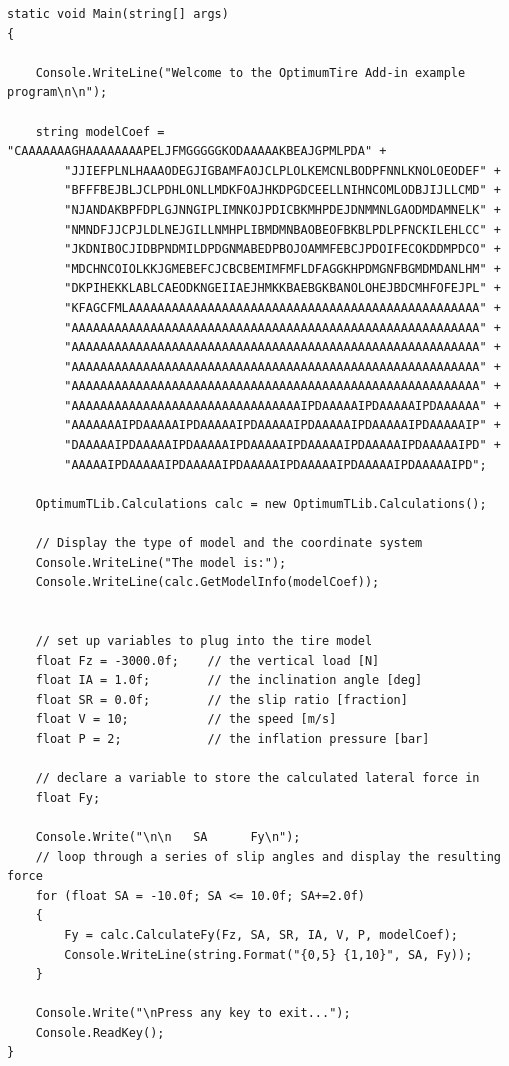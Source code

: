 \begin{verbatim}
static void Main(string[] args)
{

    Console.WriteLine("Welcome to the OptimumTire Add-in example program\n\n");
           
    string modelCoef = "CAAAAAAAGHAAAAAAAAPELJFMGGGGGKODAAAAAKBEAJGPMLPDA" +
        "JJIEFPLNLHAAAODEGJIGBAMFAOJCLPLOLKEMCNLBODPFNNLKNOLOEODEF" +
        "BFFFBEJBLJCLPDHLONLLMDKFOAJHKDPGDCEELLNIHNCOMLODBJIJLLCMD" +
        "NJANDAKBPFDPLGJNNGIPLIMNKOJPDICBKMHPDEJDNMMNLGAODMDAMNELK" +
        "NMNDFJJCPJLDLNEJGILLNMHPLIBMDMNBAOBEOFBKBLPDLPFNCKILEHLCC" +
        "JKDNIBOCJIDBPNDMILDPDGNMABEDPBOJOAMMFEBCJPDOIFECOKDDMPDCO" +
        "MDCHNCOIOLKKJGMEBEFCJCBCBEMIMFMFLDFAGGKHPDMGNFBGMDMDANLHM" +
        "DKPIHEKKLABLCAEODKNGEIIAEJHMKKBAEBGKBANOLOHEJBDCMHFOFEJPL" +
        "KFAGCFMLAAAAAAAAAAAAAAAAAAAAAAAAAAAAAAAAAAAAAAAAAAAAAAAAA" +
        "AAAAAAAAAAAAAAAAAAAAAAAAAAAAAAAAAAAAAAAAAAAAAAAAAAAAAAAAA" +
        "AAAAAAAAAAAAAAAAAAAAAAAAAAAAAAAAAAAAAAAAAAAAAAAAAAAAAAAAA" +
        "AAAAAAAAAAAAAAAAAAAAAAAAAAAAAAAAAAAAAAAAAAAAAAAAAAAAAAAAA" +
        "AAAAAAAAAAAAAAAAAAAAAAAAAAAAAAAAAAAAAAAAAAAAAAAAAAAAAAAAA" +
        "AAAAAAAAAAAAAAAAAAAAAAAAAAAAAAAAIPDAAAAAIPDAAAAAIPDAAAAAA" +
        "AAAAAAAIPDAAAAAIPDAAAAAIPDAAAAAIPDAAAAAIPDAAAAAIPDAAAAAIP" +
        "DAAAAAIPDAAAAAIPDAAAAAIPDAAAAAIPDAAAAAIPDAAAAAIPDAAAAAIPD" +
        "AAAAAIPDAAAAAIPDAAAAAIPDAAAAAIPDAAAAAIPDAAAAAIPDAAAAAIPD";

    OptimumTLib.Calculations calc = new OptimumTLib.Calculations();

    // Display the type of model and the coordinate system
    Console.WriteLine("The model is:");
    Console.WriteLine(calc.GetModelInfo(modelCoef));


    // set up variables to plug into the tire model
    float Fz = -3000.0f;    // the vertical load [N]
    float IA = 1.0f;        // the inclination angle [deg]
    float SR = 0.0f;        // the slip ratio [fraction]
    float V = 10;           // the speed [m/s]
    float P = 2;            // the inflation pressure [bar]

    // declare a variable to store the calculated lateral force in
    float Fy;
            
    Console.Write("\n\n   SA      Fy\n");
    // loop through a series of slip angles and display the resulting force
    for (float SA = -10.0f; SA <= 10.0f; SA+=2.0f)
    {
        Fy = calc.CalculateFy(Fz, SA, SR, IA, V, P, modelCoef);
        Console.WriteLine(string.Format("{0,5} {1,10}", SA, Fy));
    }

    Console.Write("\nPress any key to exit...");
    Console.ReadKey();
}
\end{verbatim}

